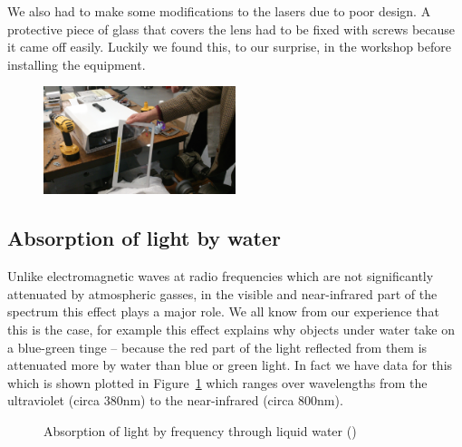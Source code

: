 We also had to make some modifications to the lasers due to poor
design. A protective piece of glass that covers the lens had to be
fixed with screws because it came off easily. Luckily we found this,
to our surprise, in the workshop before installing the equipment.

\begin{figure}[h]
  \begin{center}
    \includegraphics[width=0.5\textwidth]{faulty}
  \end{center}
\end{figure}

\clearpage
\subsection{Absorption of light by water}
\label{sec:absorption}

Unlike electromagnetic waves at radio frequencies which are not
significantly attenuated by atmospheric gasses, in the visible and
near-infrared part of the spectrum this effect plays a major role. We
all know from our experience that this is the case, for example this
effect explains why objects under water take on a blue-green tinge --
because the red part of the light reflected from them is attenuated
more by water than blue or green light. In fact we have data for this
which is shown plotted in Figure~\ref{fig:absorption-liquid} which
ranges over wavelengths from the ultraviolet (circa 380nm) to the
near-infrared (circa 800nm).
\begin{figure}[h]
  \centering
  \caption{Absorption of light by frequency through liquid water
    (\cite{jonasz_absorption_2007})}
  \label{fig:absorption-liquid}
\end{figure}

